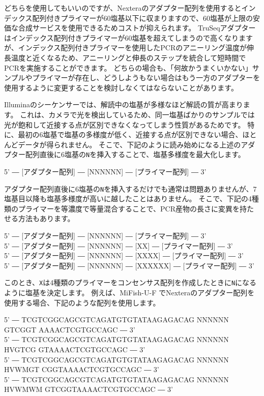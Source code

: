 \documentclass[titlepage,10pt,a4paper,uplatex]{jsbook}
\newenvironment{pre}{\begin{leftbar}\raggedright\ttfamily\footnotesize\setlength{\baselineskip}{1.4em}}{\end{leftbar}\vspace{-1em}}
\begin{document}
どちらを使用してもいいのですが、Nexteraのアダプター配列を使用するとインデックス配列付きプライマーが60塩基以下に収まりますので、60塩基が上限の安価な合成サービスを使用できるためコストが抑えられます。
TruSeqアダプターはインデックス配列付きプライマーが60塩基を超えてしまうので高くなりますが、インデックス配列付きプライマーを使用したPCRのアニーリング温度が伸長温度と近くなるため、アニーリングと伸長のステップを統合して短時間でPCRを実施することができます。
どちらの場合も、「何故かうまくいかない」サンプルやプライマーが存在し、どうしようもない場合はもう一方のアダプターを使用するように変更することを検討しなくてはならないことがあります。

Illuminaのシーケンサーでは、解読中の塩基が多様なほど解読の質が高まります。
これは、カメラで光を検出しているため、同一塩基ばかりのサンプルでは光が飽和して近接する点が区別できなくなってしまう性質があるためです。
特に、最初の6塩基で塩基の多様度が低く、近接する点が区別できない場合、ほとんどデータが得られません。
そこで、下記のように読み始めになる上述のアダプター配列直後に6塩基の\texttt{N}を挿入することで、塩基多様度を最大化します。

\begin{pre}
5' ― [アダプター配列] ― [NNNNNN] ― [プライマー配列] ― 3'\\
\end{pre}

アダプター配列直後に6塩基の\texttt{N}を挿入するだけでも通常は問題ありませんが、7塩基目以降も塩基多様度が高いに越したことはありません。
そこで、下記の4種類のプライマーを等濃度で等量混合することで、PCR産物の長さに変異を持たせる方法もあります。

\begin{pre}
5' ― [アダプター配列] ― [NNNNNN] ― [プライマー配列] ― 3'\\
5' ― [アダプター配列] ― [NNNNNN] ― [XX] ― [プライマー配列] ― 3'\\
5' ― [アダプター配列] ― [NNNNNN] ― [XXXX] ― [プライマー配列] ― 3'\\
5' ― [アダプター配列] ― [NNNNNN] ― [XXXXXX] ― [プライマー配列] ― 3'
\end{pre}

このとき、\texttt{X}は4種類のプライマーをコンセンサス配列を作成したときに\texttt{N}になるように塩基を決定します。
例えば、MiFish-U-F \citep{Miya2015}でNexteraのアダプター配列を使用する場合、下記のような配列を使用します。

\begin{pre}
5' ― TCGTCGGCAGCGTCAGATGTGTATAAGAGACAG NNNNNN GTCGGT AAAACTCGTGCCAGC ― 3'\\
5' ― TCGTCGGCAGCGTCAGATGTGTATAAGAGACAG NNNNNN HVGTCG GTAAAACTCGTGCCAGC ― 3'\\
5' ― TCGTCGGCAGCGTCAGATGTGTATAAGAGACAG NNNNNN HVWMGT CGGTAAAACTCGTGCCAGC ― 3'\\
5' ― TCGTCGGCAGCGTCAGATGTGTATAAGAGACAG NNNNNN HVWMWM GTCGGTAAAACTCGTGCCAGC ― 3'
\end{pre}
\end{document}

